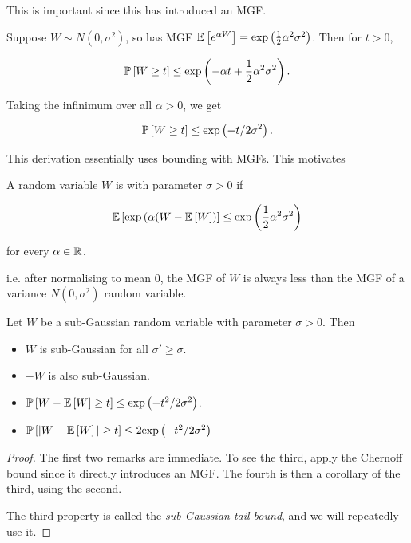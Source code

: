 \documentclass[11pt]{scrartcl}
\begin{document}
This is important since this has introduced an MGF.

\begin{example}
Suppose $W \sim N(0,\sigma^2)$, so has MGF $\mathbb{E} \left[ e^{\alpha W} \right] = \text{exp} \left( \frac12 \alpha^2 \sigma^2 \right)$. Then for $t>0$,

\begin{equation}
    \P{W \ge t} \le \exp{-\alpha t + \frac12 \alpha^2 \sigma^2}.
\label{L2:Gaussian tail bound}
\end{equation}

Taking the infinimum over all $\alpha > 0$, we get 

\begin{equation}
    \P{W \ge t} \le \exp{-t/2\sigma^2}.
\label{L2:Gaussian tail bound 2}
\end{equation}
\end{example}

This derivation essentially uses bounding with MGFs. This motivates

\begin{definition}
A random variable $W$ is  with parameter $\sigma > 0$ if

\begin{equation}
    \mathbb{E} \left[ \text{exp} \left( \alpha(W - \mathbb{E} \left[ W \right] \right) \right] \le \text{exp} \left( \frac12 \alpha^2 \sigma^2 \right)
\end{equation}

for every $\alpha \in \mathbb R$.
\end{definition}

i.e. after normalising to mean 0, the MGF of $W$ is always less than the MGF of a variance $N(0,\sigma^2)$ random variable.

\begin{example}
Let $W$ be a sub-Gaussian random variable with parameter $\sigma>0$. Then
\begin{itemize}
    \item $W$ is sub-Gaussian for all $\sigma' \ge \sigma$.
    \item $-W$ is also sub-Gaussian.
    \item $\mathbb{P} \left[ W - \mathbb{E} \left[ W \right] \ge t \right] \le \text{exp} \left( -t^2 / 2 \sigma^2 \right)$.
    \item $\mathbb{P} \left[ | W - \mathbb{E} \left[ W \right]| \ge t \right] \le 2\text{exp} \left( -t^2 / 2 \sigma^2 \right)$
\end{itemize}

\label{L2: subg properties}

\begin{proof}
The first two remarks are immediate. To see the third, apply the Chernoff bound since it directly introduces an MGF. The fourth is then a corollary of the third, using the second.

The third property is called the \emph{sub-Gaussian tail bound}, and we will repeatedly use it.
\end{proof}
\end{example}
\end{document}
